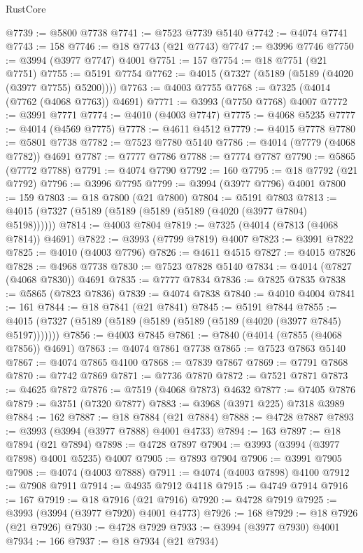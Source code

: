\begin{lexlean}{RustCore}
\begin{coremodule}
@7739 := @5800 @7738
@7741 := @7523 @7739 @5140
@7742 := @4074 @7741
@7743 := 158
@7746 := @18 @7743 (@21 @7743)
@7747 := @3996 @7746
@7750 := @3994 (@3977 @7747) @4001
@7751 := 157
@7754 := @18 @7751 (@21 @7751)
@7755 := @5191 @7754
@7762 := @4015 (@7327 (@5189 (@5189 (@4020 (@3977 @7755) @5200))))
@7763 := @4003 @7755
@7768 := @7325 (@4014 (@7762 (@4068 @7763)) @4691)
@7771 := @3993 (@7750 @7768) @4007
@7772 := @3991 @7771
@7774 := @4010 (@4003 @7747)
@7775 := @4068 @5235
@7777 := @4014 (@4569 @7775)
@7778 := @4611 @4512
@7779 := @4015 @7778
@7780 := @5801 @7738
@7782 := @7523 @7780 @5140
@7786 := @4014 (@7779 (@4068 @7782)) @4691
@7787 := @7777 @7786
@7788 := @7774 @7787
@7790 := @5865 (@7772 @7788)
@7791 := @4074 @7790
@7792 := 160
@7795 := @18 @7792 (@21 @7792)
@7796 := @3996 @7795
@7799 := @3994 (@3977 @7796) @4001
@7800 := 159
@7803 := @18 @7800 (@21 @7800)
@7804 := @5191 @7803
@7813 := @4015 (@7327 (@5189 (@5189 (@5189 (@5189 (@4020 (@3977 @7804) @5198))))))
@7814 := @4003 @7804
@7819 := @7325 (@4014 (@7813 (@4068 @7814)) @4691)
@7822 := @3993 (@7799 @7819) @4007
@7823 := @3991 @7822
@7825 := @4010 (@4003 @7796)
@7826 := @4611 @4515
@7827 := @4015 @7826
@7828 := @4968 @7738
@7830 := @7523 @7828 @5140
@7834 := @4014 (@7827 (@4068 @7830)) @4691
@7835 := @7777 @7834
@7836 := @7825 @7835
@7838 := @5865 (@7823 @7836)
@7839 := @4074 @7838
@7840 := @4010 @4004
@7841 := 161
@7844 := @18 @7841 (@21 @7841)
@7845 := @5191 @7844
@7855 := @4015 (@7327 (@5189 (@5189 (@5189 (@5189 (@5189 (@4020 (@3977 @7845) @5197)))))))
@7856 := @4003 @7845
@7861 := @7840 (@4014 (@7855 (@4068 @7856)) @4691)
@7863 := @4074 @7861 @7738
@7865 := @7523 @7863 @5140
@7867 := @4074 @7865 @4100
@7868 := @7839 @7867
@7869 := @7791 @7868
@7870 := @7742 @7869
@7871 := @7736 @7870
@7872 := @7521 @7871
@7873 := @4625 @7872
@7876 := @7519 (@4068 @7873) @4632
@7877 := @7405 @7876
@7879 := @3751 (@7320 @7877)
@7883 := @3968 (@3971 @225) @7318 @3989
@7884 := 162
@7887 := @18 @7884 (@21 @7884)
@7888 := @4728 @7887
@7893 := @3993 (@3994 (@3977 @7888) @4001 @4733)
@7894 := 163
@7897 := @18 @7894 (@21 @7894)
@7898 := @4728 @7897
@7904 := @3993 (@3994 (@3977 @7898) @4001 @5235) @4007
@7905 := @7893 @7904
@7906 := @3991 @7905
@7908 := @4074 (@4003 @7888)
@7911 := @4074 (@4003 @7898) @4100
@7912 := @7908 @7911
@7914 := @4935 @7912 @4118
@7915 := @4749 @7914
@7916 := 167
@7919 := @18 @7916 (@21 @7916)
@7920 := @4728 @7919
@7925 := @3993 (@3994 (@3977 @7920) @4001 @4773)
@7926 := 168
@7929 := @18 @7926 (@21 @7926)
@7930 := @4728 @7929
@7933 := @3994 (@3977 @7930) @4001
@7934 := 166
@7937 := @18 @7934 (@21 @7934)

\end{coremodule}
\end{lexlean}
